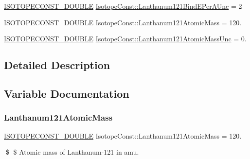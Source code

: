 \begin{DoxyCompactItemize}
\mbox{\hyperlink{group___isotope_const-_macros_ga8f45a7272ce02c0b4c65c44636ed719a}{I\+S\+O\+T\+O\+P\+E\+C\+O\+N\+S\+T\+\_\+\+D\+O\+U\+B\+LE}} \mbox{\hyperlink{group___isotope_const-_lanthanum-_la121_ga0a6059e739011d3006a2167662514d92}{Isotope\+Const\+::\+Lanthanum121\+Bind\+E\+Per\+A\+Unc}} = 2
\item 
\mbox{\hyperlink{group___isotope_const-_macros_ga8f45a7272ce02c0b4c65c44636ed719a}{I\+S\+O\+T\+O\+P\+E\+C\+O\+N\+S\+T\+\_\+\+D\+O\+U\+B\+LE}} \mbox{\hyperlink{group___isotope_const-_lanthanum-_la121_gad85e991d8dacba6e8b3661f382b81f2c}{Isotope\+Const\+::\+Lanthanum121\+Atomic\+Mass}} = 120.
\item 
\mbox{\hyperlink{group___isotope_const-_macros_ga8f45a7272ce02c0b4c65c44636ed719a}{I\+S\+O\+T\+O\+P\+E\+C\+O\+N\+S\+T\+\_\+\+D\+O\+U\+B\+LE}} \mbox{\hyperlink{group___isotope_const-_lanthanum-_la121_gafe2675bfd5094b915ec02529976b9c85}{Isotope\+Const\+::\+Lanthanum121\+Atomic\+Mass\+Unc}} = 0.
\end{DoxyCompactItemize}


\subsection{Detailed Description}


\subsection{Variable Documentation}
\mbox{\label{group___isotope_const-_lanthanum-_la121_gad85e991d8dacba6e8b3661f382b81f2c}} 
\subsubsection{\texorpdfstring{Lanthanum121\+Atomic\+Mass}{Lanthanum121AtomicMass}}
{\footnotesize\ttfamily \mbox{\hyperlink{group___isotope_const-_macros_ga8f45a7272ce02c0b4c65c44636ed719a}{I\+S\+O\+T\+O\+P\+E\+C\+O\+N\+S\+T\+\_\+\+D\+O\+U\+B\+LE}} Isotope\+Const\+::\+Lanthanum121\+Atomic\+Mass = 120.}

\$ \$ Atomic mass of Lanthanum-\/121 in amu. \mbox{\label{group___isotope_const-_lanthanum-_la121_gafe2675bfd5094b915ec02529976b9c85}} 

